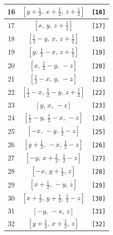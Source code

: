 \documentclass[fleqn,8pt]{jsarticle}
\begin{document}
\begin{longtable}{ccc}
16 & $\left[ y + \frac{1}{2},\, x + \frac{1}{2},\, z + \frac{1}{2} \right]$ & {\tt [16]} \\ \hline
17 & $\left[ x,\, y,\, z + \frac{1}{2} \right]$ & {\tt [17]} \\ \hline
18 & $\left[ \frac{1}{2} - y,\, x,\, z + \frac{1}{2} \right]$ & {\tt [18]} \\ \hline
19 & $\left[ y,\, \frac{1}{2} - x,\, z + \frac{1}{2} \right]$ & {\tt [19]} \\ \hline
20 & $\left[ x,\, \frac{1}{2} - y,\, - z \right]$ & {\tt [20]} \\ \hline
21 & $\left[ \frac{1}{2} - x,\, y,\, - z \right]$ & {\tt [21]} \\ \hline
22 & $\left[ \frac{1}{2} - x,\, \frac{1}{2} - y,\, z + \frac{1}{2} \right]$ & {\tt [22]} \\ \hline
23 & $\left[ y,\, x,\, - z \right]$ & {\tt [23]} \\ \hline
24 & $\left[ \frac{1}{2} - y,\, \frac{1}{2} - x,\, - z \right]$ & {\tt [24]} \\ \hline
25 & $\left[ - x,\, - y,\, \frac{1}{2} - z \right]$ & {\tt [25]} \\ \hline
26 & $\left[ y + \frac{1}{2},\, - x,\, \frac{1}{2} - z \right]$ & {\tt [26]} \\ \hline
27 & $\left[ - y,\, x + \frac{1}{2},\, \frac{1}{2} - z \right]$ & {\tt [27]} \\ \hline
28 & $\left[ - x,\, y + \frac{1}{2},\, z \right]$ & {\tt [28]} \\ \hline
29 & $\left[ x + \frac{1}{2},\, - y,\, z \right]$ & {\tt [29]} \\ \hline
30 & $\left[ x + \frac{1}{2},\, y + \frac{1}{2},\, \frac{1}{2} - z \right]$ & {\tt [30]} \\ \hline
31 & $\left[ - y,\, - x,\, z \right]$ & {\tt [31]} \\ \hline
32 & $\left[ y + \frac{1}{2},\, x + \frac{1}{2},\, z \right]$ & {\tt [32]} \\
\end{longtable}
\end{document}
